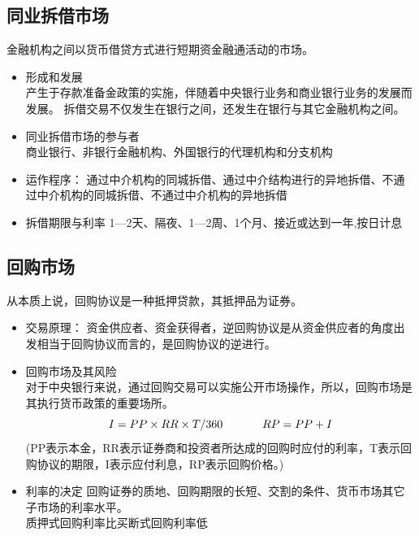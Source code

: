 \documentclass{article}
\begin{document}
\subsection*{同业拆借市场}
金融机构之间以货币借贷方式进行短期资金融通活动的市场。
\begin{itemize}
    \item 形成和发展\\
    产生于存款准备金政策的实施，伴随着中央银行业务和商业银行业务的发展而发展。
    拆借交易不仅发生在银行之间，还发生在银行与其它金融机构之间。
    \item 同业拆借市场的参与者\\
    商业银行、非银行金融机构、外国银行的代理机构和分支机构
    \item 运作程序：
    通过中介机构的同城拆借、通过中介结构进行的异地拆借、不通过中介机构的同城拆借、不通过中介机构的异地拆借
    \item 拆借期限与利率
    1—2天、隔夜、1—2周、1个月、接近或达到一年,按日计息
\end{itemize}
\subsection*{回购市场}
从本质上说，回购协议是一种抵押贷款，其抵押品为证券。
\begin{itemize}
    \item 交易原理：
    资金供应者、资金获得者，逆回购协议是从资金供应者的角度出发相当于回购协议而言的，是回购协议的逆进行。
    \item 回购市场及其风险\\
    {\color{red}{$\star$}}对于中央银行来说，通过回购交易可以实施公开市场操作，所以，回购市场是其执行货币政策的重要场所。
    \[I=PP\times RR\times T / 360  \hspace*{35pt} RP=PP+I\]
    (PP表示本金，RR表示证券商和投资者所达成的回购时应付的利率，T表示回购协议的期限，I表示应付利息，RP表示回购价格。)
    \item 利率的决定
    回购证券的质地、回购期限的长短、交割的条件、货币市场其它子市场的利率水平。\\
    {\color{red}{$\star$}}质押式回购利率比买断式回购利率低
\end{itemize}
\clearpage
\end{document}
